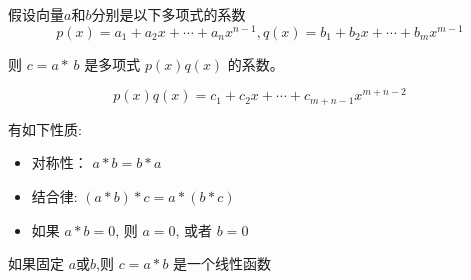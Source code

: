\begin{corollary}
    假设向量$a$和$b$分别是以下多项式的系数
    \begin{equation} p(x)=a_{1}+a_{2} x+\cdots+a_{n} x^{n-1}, q(x)=b_{1}+b_{2} x+\cdots+b_{m} x^{m-1} \end{equation}

    则 $ {c}={a}{*} {~b} $ 是多项式 $ p(x) q(x) $ 的系数。

    \begin{equation} p(x) q(x)=c_{1}+c_{2} x+\cdots+c_{m+n-1} x^{m+n-2} \end{equation}
\end{corollary}

\begin{corollary}[卷积性质]
    有如下性质:
    \begin{itemize}
        \item 对称性： $ a * b=b * a $
        \item 结合律: $ (a * b) * c=a *(b * c) $
        \item 如果 $ a * b=0 $, 则 $ a=0 $, 或者 $ b=0 $
    \end{itemize}
\end{corollary}

\begin{corollary}
    如果固定 $ a $或$b$,则 $ c=a * b $ 是一个线性函数
\end{corollary}

